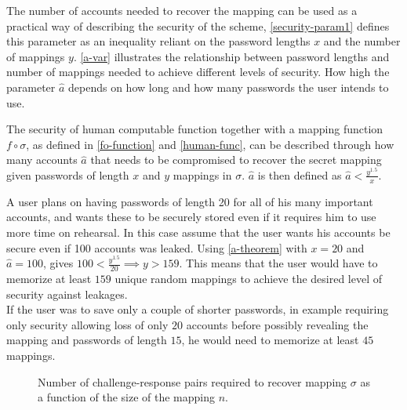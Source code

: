 \par The number of accounts needed to recover the mapping can be used as a practical way of describing the security of the scheme, \autoref{security-param1} defines this parameter as an inequality reliant on the password lengths $x$ and the number of mappings $y$. \autoref{a-var} illustrates the relationship between password lengths and number of mappings needed to achieve different levels of security. How high the parameter $\hat a$ depends on how long and how many passwords the user intends to use. 


\begin{theorem}
    \label{security-param1}
    The security of human computable function together with a mapping function $f \circ \sigma$, as defined in \autoref{fo-function} and \autoref{human-func}, can be described through how many accounts $\hat a$ that needs to be compromised to recover the secret mapping given passwords of length $x$ and $y$ mappings in $\sigma$. $\hat a$ is then defined as
    $ \hat a < \frac{y^{ 1.5 }}{x} $.
    \label{a-theorem}
\end{theorem}

\begin{example}
    A user plans on having passwords of length 20 for all of his many important accounts, and wants these to be securely stored even if it requires him to use more time on rehearsal. In this case assume that the user wants his accounts be secure even if 100 accounts was leaked. Using \autoref{a-theorem} with $x=20$ and $\hat a = 100$, gives $100 < \frac{y^{1.5}}{20} \implies y > 159$. This means that the user would have to memorize at least $159$ unique random mappings to achieve the desired level of security against leakages. \\
    If the user was to save only a couple of shorter passwords, in example requiring only security allowing loss of only $20$ accounts before possibly revealing the mapping and passwords of length $15$, he would need to memorize at least $45$ mappings. 
\end{example}

\begin{figure}
\caption{Number of challenge-response pairs required to recover mapping $\sigma$ as a function of the size of the mapping $n$. }
\label{trade-off1}
\end{figure}

